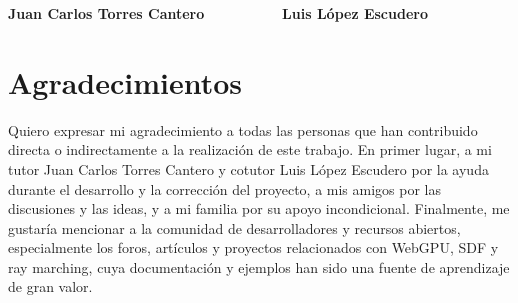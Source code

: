 \noindent \textbf{Juan Carlos Torres Cantero \ \ \ \ \ \ \ \ \   Luis López Escudero}

\chapter*{Agradecimientos}
\thispagestyle{empty}

       \vspace{1cm}


Quiero expresar mi agradecimiento a todas las personas que han contribuido directa o indirectamente a la realización de este trabajo.
En primer lugar, a mi tutor Juan Carlos Torres Cantero y cotutor Luis
López Escudero por la ayuda durante el desarrollo y la corrección del proyecto, a mis amigos por las discusiones y las ideas, y a mi familia por su apoyo incondicional.
\bigbreak
Finalmente, me gustaría mencionar a la comunidad de desarrolladores y
recursos abiertos, especialmente los foros, artículos y proyectos relacionados
con WebGPU, SDF y ray marching, cuya documentación y ejemplos han
sido una fuente de aprendizaje de gran valor.